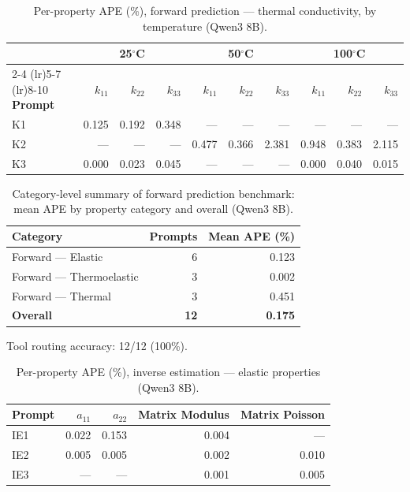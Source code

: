 \documentclass[preprint,review,10pt,number]{elsarticle}
\begin{document}
\begin{table}[htbp]
\centering
\caption{Per-property APE (\%), forward prediction --- thermal conductivity, by temperature (Qwen3 8B).}
\label{tab:mape_thermal_8b}
\begin{tabular}{lrrrrrrrrr}
\toprule
& \multicolumn{3}{c}{25$^\circ$C} & \multicolumn{3}{c}{50$^\circ$C} & \multicolumn{3}{c}{100$^\circ$C} \\
\cmidrule(lr){2-4} \cmidrule(lr){5-7} \cmidrule(lr){8-10}
\textbf{Prompt} & $k_{11}$ & $k_{22}$ & $k_{33}$ & $k_{11}$ & $k_{22}$ & $k_{33}$ & $k_{11}$ & $k_{22}$ & $k_{33}$ \\
\midrule
K1 & 0.125 & 0.192 & 0.348 & --- & --- & --- & --- & --- & --- \\
K2 & --- & --- & --- & 0.477 & 0.366 & 2.381 & 0.948 & 0.383 & 2.115 \\
K3 & 0.000 & 0.023 & 0.045 & --- & --- & --- & 0.000 & 0.040 & 0.015 \\
\bottomrule
\end{tabular}
\end{table}

\begin{table}[htbp]
\centering
\caption{Category-level summary of forward prediction benchmark: mean APE by property category and overall (Qwen3 8B).}
\label{tab:category_summary_mape_8b}
\begin{tabular}{lrr}
\toprule
\textbf{Category} & \textbf{Prompts} & \textbf{Mean APE (\%)} \\
\midrule
Forward --- Elastic       & 6  & 0.123 \\
Forward --- Thermoelastic & 3  & 0.002 \\
Forward --- Thermal       & 3  & 0.451 \\
\midrule
\textbf{Overall}          & \textbf{12} & \textbf{0.175} \\
\bottomrule
\end{tabular}

\vspace{4pt}
\footnotesize Tool routing accuracy: 12/12 (100\%).
\end{table}

\begin{table}[htbp]
\centering
\caption{Per-property APE (\%), inverse estimation --- elastic properties (Qwen3 8B).}
\label{tab:inv_mape_elastic_8b}
\begin{tabular}{lrrrr}
\toprule
\textbf{Prompt} & $a_{11}$ & $a_{22}$ & Matrix Modulus & Matrix Poisson \\
\midrule
IE1 & 0.022 & 0.153 & 0.004 & --- \\
IE2 & 0.005 & 0.005 & 0.002 & 0.010 \\
IE3 & ---   & ---   & 0.001 & 0.005 \\
\bottomrule
\end{tabular}
\end{table}
\end{document}
